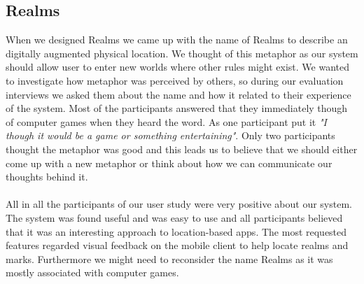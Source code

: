 \subsection{Realms} %
\label{sub:realms}
When we designed Realms we came up with the name of Realms to describe an digitally augmented physical location. We thought of this metaphor as our system should allow user to enter new worlds where other rules might exist. We wanted to investigate how metaphor was perceived by others, so during our evaluation interviews we asked them about the name and how it related to their experience of the system.
Most of the participants answered that they immediately though of computer games when they heard the word. As one participant put it \emph{"I though it would be a game or something entertaining"}. Only two participants thought the metaphor was good and this leads us to believe that we should either come up with a new metaphor or think about how we can communicate our thoughts behind it. 
\\\\
All in all the participants of our user study were very positive about our system. The system was found useful and was easy to use and all participants believed that it was an interesting approach to location-based apps. The most requested features regarded visual feedback on the mobile client to help locate realms and marks. Furthermore we might need to reconsider the name Realms as it was mostly associated with computer games. 

